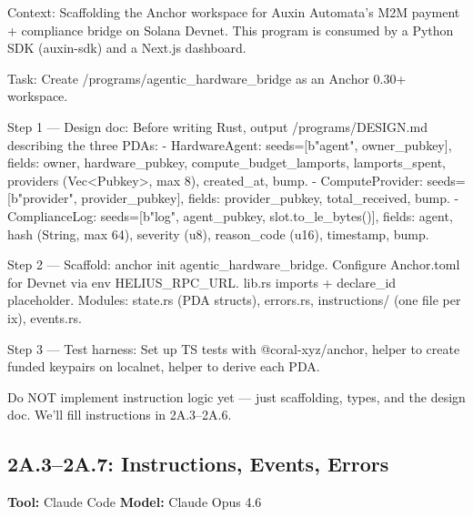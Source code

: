 \documentclass[11pt, a4paper]{article}
\begin{document}
\begin{promptbox}
Context: Scaffolding the Anchor workspace for Auxin Automata's M2M payment + compliance bridge on Solana Devnet. This program is consumed by a Python SDK (auxin-sdk) and a Next.js dashboard.

Task: Create /programs/agentic_hardware_bridge as an Anchor 0.30+ workspace.

Step 1 --- Design doc: Before writing Rust, output /programs/DESIGN.md describing the three PDAs:
- HardwareAgent: seeds=[b"agent", owner_pubkey], fields: owner, hardware_pubkey, compute_budget_lamports, lamports_spent, providers (Vec<Pubkey>, max 8), created_at, bump.
- ComputeProvider: seeds=[b"provider", provider_pubkey], fields: provider_pubkey, total_received, bump.
- ComplianceLog: seeds=[b"log", agent_pubkey, slot.to_le_bytes()], fields: agent, hash (String, max 64), severity (u8), reason_code (u16), timestamp, bump.

Step 2 --- Scaffold: anchor init agentic_hardware_bridge. Configure Anchor.toml for Devnet via env HELIUS_RPC_URL. lib.rs imports + declare_id placeholder. Modules: state.rs (PDA structs), errors.rs, instructions/ (one file per ix), events.rs.

Step 3 --- Test harness: Set up TS tests with @coral-xyz/anchor, helper to create funded keypairs on localnet, helper to derive each PDA.

Do NOT implement instruction logic yet --- just scaffolding, types, and the design doc. We'll fill instructions in 2A.3--2A.6.
\end{promptbox}

\subsection*{2A.3--2A.7: Instructions, Events, Errors}
\textbf{Tool:} Claude Code \quad \textbf{Model:} Claude Opus 4.6
\end{document}
